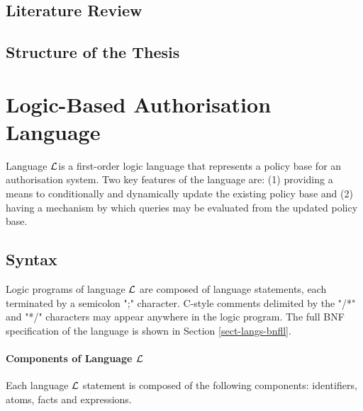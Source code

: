 \documentclass[11pt]{report}
\begin{document}
    \section{Literature Review}
      \label{sect-intro-litre}

    \section{Structure of the Thesis}
      \label{sect-intro-struc}

  \chapter{Logic-Based Authorisation Language}
    \label{chap-langl}

    Language $\cal{L}$\footnotemark is a first-order logic language that
    represents a policy base for an authorisation system. Two key features of
    the language are: (1) providing a means to conditionally and dynamically
    update the existing policy base and (2) having a mechanism by which
    queries may be evaluated from the updated policy base.


    \section{Syntax}
      \label{sect-langl-syntx}

      Logic programs of language ${\cal L}$ are composed of language
      statements, each terminated by a semicolon ";" character. C-style
      comments delimited by the "/*" and "*/" characters may appear anywhere
      in the logic program. The full BNF specification of the language is
      shown in Section \ref{sect-langs-bnfll}.

      \subsubsection{Components of Language $\cal{L}$}
        \label{subs-langl-compo}

        Each language ${\cal L}$ statement is composed of the following
        components: identifiers, atoms, facts and expressions.
\end{document}
